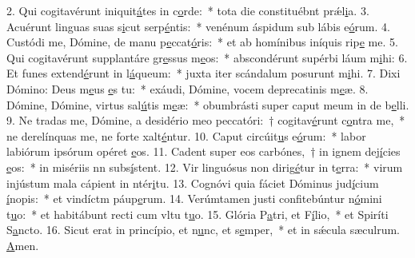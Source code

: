 2. Qui cogitavérunt iniquit\uline{á}tes in c\uline{o}rde:~* tota die constituébnt prǽl\uline{i}a.
3. Acuérunt linguas suas s\uline{i}cut serp\uline{é}ntis:~* venénum áspidum sub lábis e\uline{ó}rum.
4. Custódi me, Dómine, de manu p\uline{e}ccat\uline{ó}ris:~* et ab homínibus iníquis rip\uline{e} me.
5. Qui cogitavérunt supplantáre gr\uline{e}ssus m\uline{e}os:~* abscondérunt supérbi láum m\uline{i}hi:
6. Et funes extend\uline{é}runt in l\uline{á}queum:~* juxta iter scándalum posurunt m\uline{i}hi.
7. Dixi Dómino: Deus m\uline{e}us \uline{e}s tu:~* exáudi, Dómine, vocem deprecatinis m\uline{e}æ.
8. Dómine, Dómine, virtus sal\uline{ú}tis m\uline{e}æ:~* obumbrásti super caput meum in de b\uline{e}lli.
9. Ne tradas me, Dómine, a desidério meo peccatóri:~† cogitav\uline{é}runt c\uline{o}ntra me,~* ne derelínquas me, ne forte xalt\uline{é}ntur.
10. Caput circúit\uline{u}s e\uline{ó}rum:~* labor labiórum ipsórum opéret \uline{e}os.
11. Cadent super eos carbónes,~† in ignem dej\uline{í}cies \uline{e}os:~* in misériis nn subs\uline{í}stent.
12. Vir linguósus non dirig\uline{é}tur in t\uline{e}rra:~* virum injústum mala cápient in ntér\uline{i}tu.
13. Cognóvi quia fáciet Dóminus jud\uline{í}cium \uline{í}nopis:~* et vindíctm páup\uline{e}rum.
14. Verúmtamen justi confitebúntur n\uline{ó}mini t\uline{u}o:~* et habitábunt recti cum vltu t\uline{u}o.
15. Glória P\uline{a}tri, et F\uline{í}lio,~* et Spiríti S\uline{a}ncto.
16. Sicut erat in princípio, et n\uline{u}nc, et s\uline{e}mper,~* et in sǽcula sæculrum. \uline{A}men.
